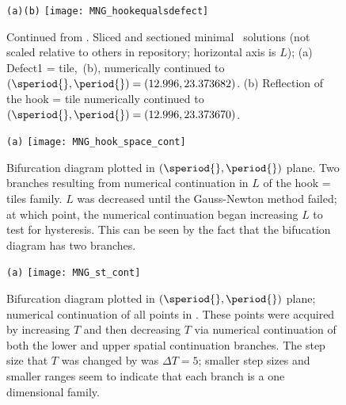 \begin{description}
\begin{figure}
\begin{minipage}[height=.32\textheight]{.8\textwidth}
\centering \small{\texttt{(a)}\qquad\qquad\texttt{(b)}}
\texttt{[image: MNG\_hookequalsdefect]}
\end{minipage}
\caption{ \label{fig:MNG_hookequalsdefect}
Continued from .
Sliced and sectioned minimal \twot\ solutions (not scaled relative to
others in repository; horizontal axis is $L$);
(a) Defect1 =  %
tile,
\,(b), numerically continued to
$(\speriod{},\period{})=(12.996,23.373682)$.
(b) Reflection of the hook  =  %
tile numerically
continued to $(\speriod{},\period{}) = (12.996,23.373670)$.
}
\end{figure}

\begin{figure}
\begin{minipage}[height=.20\textheight]{.8\textwidth}
\centering \small{\texttt{(a)}}
\texttt{[image: MNG\_hook\_space\_cont]}
\end{minipage}
\caption{ \label{fig:MNG_hook_spatial_cont}
Bifurcation diagram plotted in $(\speriod{},\period{})$ plane.
Two branches resulting from numerical continuation in $L$ of
the hook  =  %
tiles family. $L$ was decreased until the
Gauss-Newton method failed; at which point, the numerical continuation
began increasing $L$ to test for hysteresis. This can be seen by the fact
that the bifucation diagram has two branches.
}
\end{figure}

\begin{figure}
\begin{minipage}[height=.20\textheight]{.8\textwidth}
\centering \small{\texttt{(a)}}
\texttt{[image: MNG\_st\_cont]}
\end{minipage}
\caption{ \label{fig:MNG_hook_st_cont}
Bifurcation diagram plotted in $(\speriod{},\period{})$ plane; numerical continuation of all points in .
These points were acquired by increasing $T$ and then decreasing $T$ via numerical continuation of both the lower and upper spatial continuation branches. The step size that $T$ was changed by was $\Delta T = 5$; smaller step sizes and smaller ranges seem to indicate that each branch is a one dimensional family.
}
\end{figure}


\end{description}
